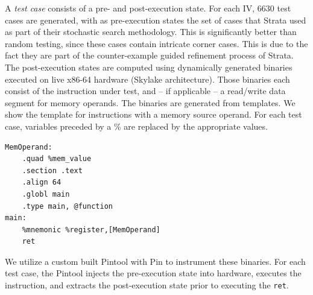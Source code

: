 
A \emph{test case} consists of a pre- and post-execution state.
For each IV, 6630 test cases are generated, with as pre-execution states the set of cases that Strata used as part of their stochastic search methodology. 
This is significantly better than random testing, since these cases contain intricate corner cases.
This is due to the fact they are part of the counter-example guided refinement process of Strata.
The post-execution states are computed using dynamically generated binaries executed on live x86-64 hardware (Skylake architecture).
Those binaries each consist of the instruction under test, and -- if applicable -- a read/write data segment for memory operands.
The binaries are generated from templates.
We show the template for instructions with a memory source operand.
For each test case, variables preceded by a \% are replaced by the appropriate values.
\begin{lstlisting}
MemOperand:	
	.quad %mem_value
	.section .text
	.align 64
	.globl main
	.type main, @function
main:
	%mnemonic %register,[MemOperand]
	ret
\end{lstlisting}
We utilize a custom built Pintool with Pin \cite{luk2005pin} to instrument these binaries.
For each test case, the Pintool injects the pre-execution state into hardware, executes the instruction, and extracts the post-execution state prior to executing the \texttt{ret}.

